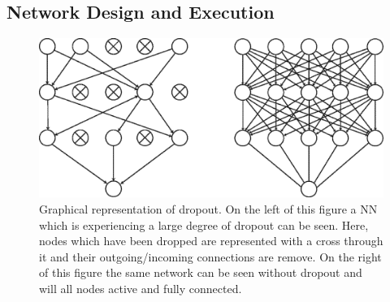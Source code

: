         \subsection{Network Design and Execution} \label{sec:pseudo_bayesian_dip_denoising_as_a_preprocessing_step_for_kinetic_modelling_in_dynamic_pet_appendix_methods_network_design_and_execution}
            \begin{figure}
                \centering
                
                \includegraphics[width=1.0\linewidth]{figures/background_dropout.png}
                
                \captionsetup{singlelinecheck=false}
                \caption{
                    Graphical representation of dropout. On the left of this figure a \gls{NN} which is experiencing a large degree of dropout can be seen. Here, nodes which have been dropped are represented with a cross through it and their outgoing/incoming connections are remove. On the right of this figure the same network can be seen without dropout and will all nodes active and fully connected.
                }
                \label{sec:pseudo_bayesian_dip_denoising_as_a_preprocessing_step_for_kinetic_modelling_in_dynamic_pet_appendix_methods_network_design_and_execution_dropout}
            \end{figure}
            
